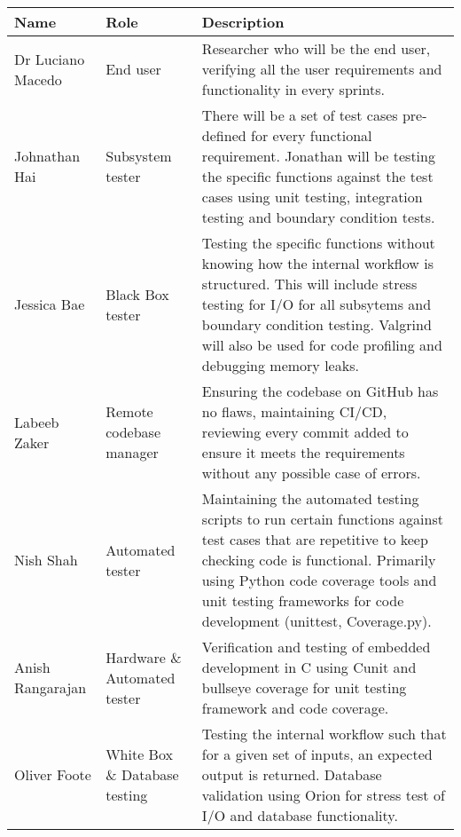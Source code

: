 \documentclass[12pt, titlepage]{article}
\begin{document}
\begin{tabular}{|m{5em}|m{5em}|m{25em}|}
  \hline
  \textbf{Name}     & \textbf{Role}           & \textbf{Description}                                                                                                                                                                        \\
  \hline
  Dr Luciano Macedo & End user                & Researcher who will be the end user, verifying all the user requirements and functionality in every sprints.                                                                                                             \\
  \hline
  Johnathan Hai     & Subsystem tester       & There will be a set of test cases pre-defined for every functional requirement. Jonathan will be testing the specific functions against the test cases using unit testing, integration testing and boundary condition tests.                                                         \\
  \hline
  Jessica Bae       & Black Box tester        & Testing the specific functions without knowing how the internal workflow is structured. This will include stress testing for I/O for all subsytems and boundary condition testing. Valgrind will also be used for code profiling and debugging memory leaks.                                                                                         \\
  \hline
  Labeeb Zaker      & Remote codebase manager & Ensuring the codebase on GitHub has no flaws, maintaining CI/CD, reviewing every commit added to ensure it meets the requirements without any possible case of errors. \\
  \hline
  Nish Shah         & Automated tester        & Maintaining the automated testing scripts to run certain functions against test cases that are repetitive to keep checking code is functional. Primarily using Python code coverage tools and unit testing frameworks for code development (unittest, Coverage.py).                                                          \\
  \hline
  Anish Rangarajan  & Hardware \& Automated tester    & Verification and testing of embedded development in C using Cunit and bullseye coverage for unit testing framework and code coverage.\\
  \hline
  Oliver Foote      & White Box \& Database testing        & Testing the internal workflow such that for a given set of inputs, an expected output is returned. Database validation using Orion for stress test of I/O and database functionality. \\
  \hline
\end{tabular}
\end{document}
